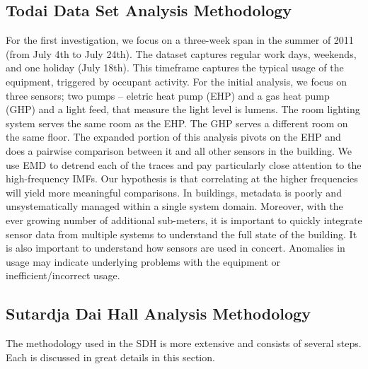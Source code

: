 \subsection{Todai Data Set Analysis Methodology}
For the first investigation, we focus on a three-week span in the summer of 2011 (from July 4th to July 24th).
The dataset captures regular work days, weekends, and one holiday (July 18th).  This timeframe captures
the typical usage of the equipment, triggered by occupant activity.  For the initial
analysis, we focus on three sensors; two pumps -- eletric heat pump (EHP) and a gas heat pump (GHP) and a light feed,
that measure the light level is lumens.  
The room lighting system serves the same room as the EHP.  The GHP
serves a different room on the same floor.  The expanded portion of this analysis pivots on the EHP
and does a pairwise comparison between it and all other sensors in the building.
We use EMD to detrend each of the traces and pay particularly close attention to the high-frequency IMFs.  Our 
hypothesis is that correlating at the higher frequencies will yield more meaningful comparisons.
In buildings, metadata is poorly and unsystematically managed within a single system domain.  Moreover, 
with the ever growing number of additional sub-meters, it is important to quickly integrate
sensor data from multiple systems to understand the full state of the building.  It is also important to 
understand how sensors are used in concert.  Anomalies in usage may indicate underlying problems with 
the equipment or inefficient/incorrect usage.  




\subsection{Sutardja Dai Hall Analysis Methodology}
The methodology used in the SDH is more extensive and consists of several steps. Each is discussed in great details
in this section.

